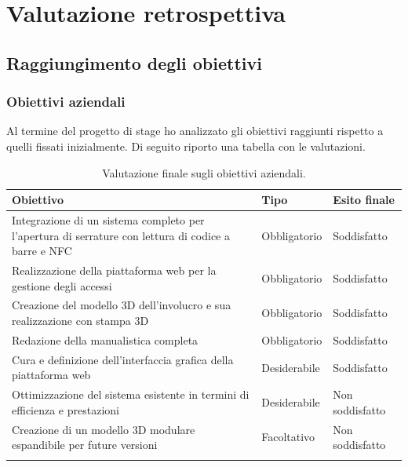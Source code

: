 
\chapter{Valutazione retrospettiva}
\label{cap:valutazione-retrospettiva}

\section{Raggiungimento degli obiettivi}
\subsection{Obiettivi aziendali}
Al termine del progetto di stage ho analizzato gli obiettivi raggiunti rispetto a quelli fissati inizialmente. Di seguito riporto una tabella con le valutazioni.

\renewcommand{\arraystretch}{1.4}
\begin{longtable}{|p{8cm}|p{2.5cm}|p{3cm}|}
\hline
\textbf{Obiettivo} & \textbf{Tipo} & \textbf{Esito finale} \\ 
\hline
Integrazione di un sistema completo per l'apertura di serrature con lettura di codice a barre e NFC & Obbligatorio & Soddisfatto \\ 
\hline
Realizzazione della piattaforma web per la gestione degli accessi & Obbligatorio & Soddisfatto \\ 
\hline
Creazione del modello 3D dell'involucro e sua realizzazione con stampa 3D & Obbligatorio & Soddisfatto \\ 
\hline
Redazione della manualistica completa & Obbligatorio & Soddisfatto \\ 
\hline
Cura e definizione dell'interfaccia grafica della piattaforma web & Desiderabile & Soddisfatto \\ 
\hline
Ottimizzazione del sistema esistente in termini di efficienza e prestazioni & Desiderabile & Non soddisfatto \\ 
\hline
Creazione di un modello 3D modulare espandibile per future versioni & Facoltativo & Non soddisfatto \\ 
\hline
\caption{Valutazione finale sugli obiettivi aziendali.}
\end{longtable}

